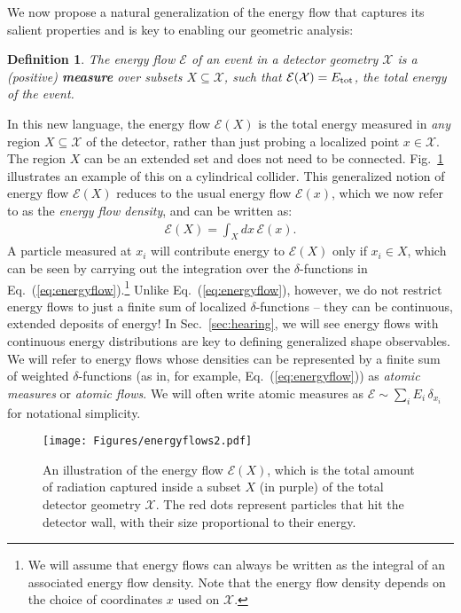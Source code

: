 \documentclass[letterpaper,11pt]{article}
\newcommand{\E}{\mathcal{E}}
\DeclareRobustCommand{\Sec}[1]{Sec.~\ref{sec:#1}}
\DeclareRobustCommand{\Fig}[1]{Fig.~\ref{fig:#1}}
\DeclareRobustCommand{\Eq}[1]{Eq.~(\ref{eq:#1})}
\newtheorem{definition}{Definition}
\begin{document}
We now propose a natural generalization of the energy flow that captures its salient properties and is key to enabling our geometric analysis:
%
\begin{definition}\label{def:energyflow}
The energy flow $\E$ of an event in a detector geometry $\mathcal{X}$ is a (positive) \textbf{measure} over subsets  $X \subseteq \mathcal{X}$, such that $\E(\mathcal{X}) = E_{\rm tot}$, the total energy of the event.
\end{definition}
%
\noindent In this new language, the energy flow $\E(X)$ is the total energy measured in \emph{any} region $X \subseteq \mathcal{X}$ of the detector, rather than just probing a localized point $x\in \mathcal{X}$.
%
The region $X$ can be an extended set and does not need to be connected.
%
\Fig{energyflowmeasure} illustrates an example of this on a cylindrical collider.
%
This generalized notion of energy flow $\E(X)$ reduces to the usual energy flow $\E(x)$, which we now refer to as the \emph{energy flow density}, and can be written as:
%
    \begin{align}
        \E(X) = \int_X dx\, \E(x). \label{eq:energyflowdensity}
    \end{align}
%
A particle measured at $x_i$ will contribute energy to $\E(X)$ only if $x_i \in X$, which can be seen by carrying out the integration over the $\delta$-functions in \Eq{energyflow}.\footnote{We will assume that energy flows can always be written as the integral of an associated energy flow density. Note that the energy flow density depends on the choice of coordinates $x$ used on $\mathcal{X}$.}
%
Unlike \Eq{energyflow}, however, we do not restrict energy flows to just a finite sum of localized $\delta$-functions -- they can be continuous, extended deposits of energy!
%
In \Sec{hearing}, we will see energy flows with continuous energy distributions are key to defining generalized shape observables.
%
We will refer to energy flows whose densities can be represented by a finite sum of weighted $\delta$-functions (as in, for example, \Eq{energyflow}) as \emph{atomic measures} or \emph{atomic flows}. We will often write atomic measures as $\E \sim \sum_i E_i\, \delta_{x_i}$ for notational simplicity.

\begin{figure}[t]
    \centering
    \texttt{[image: Figures/energyflows2.pdf]}
    \caption{An illustration of the energy flow $\mathcal{E}(X)$, which is the total amount of radiation captured inside a subset $X$ (in purple) of the total detector geometry $\mathcal{X}$. The red dots represent particles that hit the detector wall, with their size proportional to their energy. }
    \label{fig:energyflowmeasure}
\end{figure}
\end{document}
